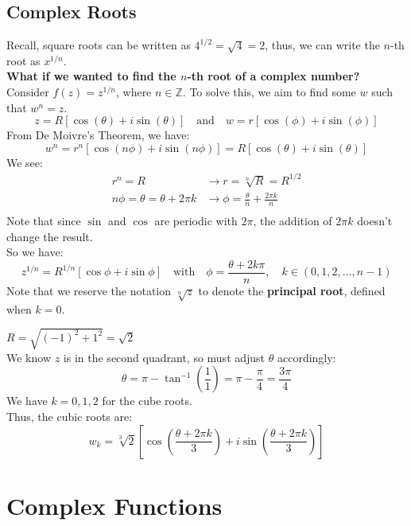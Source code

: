 \documentclass[a4paper, 10pt ]{article} %
\theoremstyle{definition}
\theoremstyle{plain}
\begin{document}
\subsection{Complex Roots}
Recall, square roots can be written as $4^{1/2} = \sqrt{4} = 2$, thus, we can write the $n$-th root as $x^{1/n}$. \\
\textbf{What if we wanted to find the $n$-th root of a complex number?} \\
Consider $f(z) = z^{1/n}$, where $n\in \mathbb{Z}$. To solve this, we aim to find some $w$ such that $w^n = z$.
$$z = R[\cos(\theta) + i \sin( \theta)] \quad \text{and} \quad w = r[\cos(\phi) + i \sin(\phi)]$$
From De Moivre's Theorem, we have:
$$w^n = r^n[\cos(n\phi) + i\sin(n\phi)] = R[\cos(\theta) + i\sin(\theta)]$$
We see:
\begin{align*}
  r^n = R                          & \rightarrow r = \sqrt[n]{R} = R^{1/2}                  \\
  n\phi = \theta = \theta + 2\pi k & \rightarrow \phi = \frac{\theta}{n} + \frac{2\pi k}{n} \\
\end{align*}
Note that since $\sin$ and $\cos$ are periodic with $2\pi$, the addition of $2\pi k$ doesn't change the result.\\
So we have:
$$z^{1/n} = R^{1/n} [\cos\phi + i \sin\phi] \quad \text{with} \quad \phi = \frac{\theta+ 2k\pi}{n}, \quad k \in (0, 1, 2, \dots, n-1)$$
Note that we reserve the notation $\sqrt[n]{z}$ to denote the \textbf{principal root}, defined when $k = 0$.

\begin{examplebox}[Find the cube roots of $z = -1 + i$]
  $R = \sqrt{(-1)^2 + 1^2} = \sqrt{2}$ \\
  We know $z$ is in the second quadrant, so must adjust $\theta$ accordingly:
  $$\theta = \pi - \tan^{-1}\left(\frac{1}{1}\right) = \pi - \frac{\pi}{4} = \frac{3\pi}{4}$$
  We have $k = 0,1,2$ for the cube roots. \\
  Thus, the cubic roots are:
  $$w_k = \sqrt[3]{2} \left[\cos\left(\frac{\theta + 2\pi k}{3}\right) + i\sin\left(\frac{\theta + 2\pi k}{3}\right)\right]$$
\end{examplebox}

\pagebreak

\section{Complex Functions}
\end{document}
